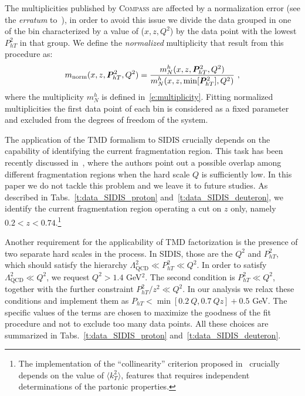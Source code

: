 \documentclass[aps,preprintnumbers,showpacs,nofootinbib,superscriptaddress,floatfix]{revtex4}
\newcommand{\compass}{\textsc{Compass }}
\newcommand{\Tperp}{T}
\begin{document}
The multiplicities published by \compass are affected by a normalization error (see the {\em erratum} to~\cite{Adolph:2013stb}), in order to avoid this issue we divide the data grouped in one of the bin characterized by a value of ($x, z, Q^2$) by the data point with the lowest $P_{hT}^2$ in that group.
We define the {\em normalized} multiplicity that result from this procedure as:
\begin{equation}
m_{\text{norm}}(x,z,\bm{P}_{h\Tperp}^2, Q^2) = \frac{m_N^h(x,z,\bm{P}_{h\Tperp}^2, Q^2)}{m_N^h (x,z,{\rm \min}[\bm{P}_{h\Tperp}^2], Q^2)} \ ,
\label{e:mult_norm}
\end{equation}
where the multiplicity $m_N^h$ is defined in~\eqref{e:multiplicity}. Fitting normalized multiplicities the first data point of each bin is considered as a fixed parameter and excluded from the degrees of freedom of the system.

The application of the TMD formalism to SIDIS crucially depends on the capability of identifying the current fragmentation region. This task has been recently discussed in~\cite{Boglione:2016bph}, where the authors point out a possible overlap among different  fragmentation regions when the hard scale $Q$ is sufficiently low. 
In this paper we do not tackle this problem and we leave it to future studies. As described in Tabs.~\ref{t:data_SIDIS_proton} and~\ref{t:data_SIDIS_deuteron}, we identify the current fragmentation region operating a cut on $z$ only, namely $0.2 < z < 0.74$.\footnote{The implementation of the ``collinearity'' criterion proposed in~\cite{Boglione:2016bph} crucially depends on the value of $\langle k_T^2 \rangle$, features that requires independent determinations of the partonic properties.}

Another requirement for the applicability of TMD factorization is the presence of two separate hard scales in the process. In SIDIS, those are the $Q^2$ and $P_{hT}^2$, which should satisfy the hierarchy $\Lambda_{\text{QCD}}^2 \ll P_{hT}^2 \ll Q^2$. 
In order to satisfy $\Lambda_{\text{QCD}}^2 \ll Q^2$, we request $Q^2 > 1.4$ GeV$^2$. 
The second condition is $P_{hT}^2 \ll Q^2$, together with the further constraint  $P_{hT}^2/z^2 \ll Q^2$. In our analysis we relax
these conditions and implement them as $P_{hT} < \min[0.2\ Q, 0.7\ Qz] + 0.5$ GeV. The specific values of the terms are chosen to maximize the goodness of the fit procedure and not to exclude too many data points.
All these choices are summarized in Tabs.~\ref{t:data_SIDIS_proton} and~\ref{t:data_SIDIS_deuteron}.
\end{document}
